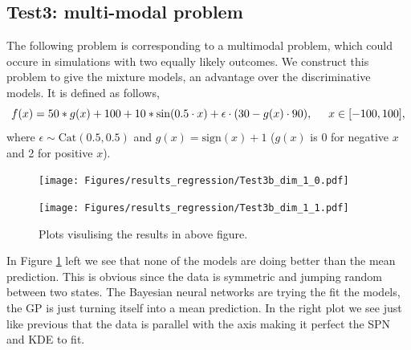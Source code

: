 \subsection*{Test3: multi-modal problem}
The following problem is corresponding to a multimodal problem, which could occure in simulations with
two equally likely outcomes. We construct this problem to give the mixture models, 
an advantage over the discriminative models. It is defined as follows, 
$$f(x) = 50*g(x)+ 100 + 10*\sin(0.5\cdot x) + \epsilon \cdot (30 - g(x) \cdot 90), \hspace*{0.5cm}x \in
[-100,100],$$ 
where $\epsilon \sim \text{Cat}(0.5,0.5)$ and $g(x) = \text{sign}(x)+1$
($g(x)$ is 0 for negative $x$ and 2 for positive $x$).

\begin{figure}[H]
  \centering
  \begin{minipage}[b]{0.49\textwidth}
   \texttt{[image: Figures/results\_regression/Test3b\_dim\_1\_0.pdf]}
  \end{minipage}
  \hfill
  \begin{minipage}[b]{0.49\textwidth}
    \texttt{[image: Figures/results\_regression/Test3b\_dim\_1\_1.pdf]}
   \end{minipage}
  \caption{Plots visulising the results in above figure.}
  \label{Test3_reg_plot}
\end{figure}

In Figure \ref{Test3_reg_plot} left we see that none of the models are doing better than the mean
prediction. This is obvious since the data is symmetric and jumping random between two states. The
Bayesian neural networks are trying the fit the models, the GP is just turning itself into a mean
prediction. In the right plot we see just like previous that the data is parallel with the axis making it perfect
the SPN and KDE to fit. 


